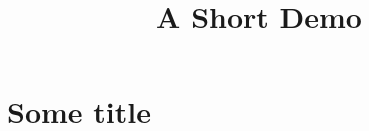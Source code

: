 \documentclass[article]{jss}
\title{A Short Demo}
\begin{document}
\section[Some foo title]{Some  title}
\end{document}

